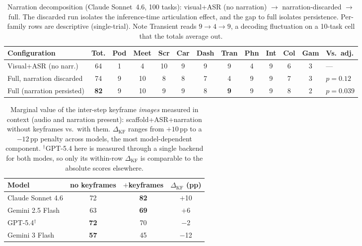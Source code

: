 \documentclass[11pt]{article}
\begin{document}
\begin{table}[!h]
\centering
\caption{Narration decomposition (Claude Sonnet~4.6, 100 tasks): visual+ASR (no
narration) $\to$ narration-discarded $\to$ full. The discarded run isolates the
inference-time articulation effect, and the gap to full isolates persistence.
Per-family rows are descriptive (single-trial). Note Transient reads $9{\to}4{\to}9$,
a decoding fluctuation on a 10-task cell that the totals average out.}
\label{tab:narration}
\small
\setlength{\tabcolsep}{3pt}
\begin{tabular}{@{}l c cccccccccc l@{}}
\toprule
\textbf{Configuration} & \textbf{Tot.} & Pod & Meet & Scr & Car & Dash & Tran & Phn & Int & Col & Gam & \textbf{Vs.\ adj.} \\
\midrule
Visual+ASR (no narr.)        & 64 & 1 & 4 & 10 & 9 & 9 & 9 & 4 & 9 & 6 & 3 & --- \\
Full, narration discarded    & 74 & 9 & 10 & 8 & 8 & 7 & 4 & 9 & 9 & 7 & 3 & $p=0.12$ \\
\rowcolor{bestcolor}
Full (narration persisted)   & \textbf{82} & 9 & 10 & 9 & 9 & 8 & \textbf{9} & 9 & 9 & 8 & 2 & $p=0.039$ \\
\bottomrule
\end{tabular}
\end{table}

\begin{table}[!h]
\centering
\caption{Marginal value of the inter-step keyframe \emph{images} measured in
context (audio and narration present): scaffold+ASR+narration without keyframes
vs.\ with them. $\Delta_\text{KF}$ ranges from $+10$\,pp to a $-12$\,pp penalty
across models, the most model-dependent component.
$^\dagger$GPT-5.4 here is measured through a single backend for both modes, so
only its within-row $\Delta_\text{KF}$ is comparable to the absolute scores
elsewhere.}
\label{tab:keyframe_context}
\small
\setlength{\tabcolsep}{6pt}
\begin{tabular}{@{}l ccc@{}}
\toprule
\textbf{Model} & \textbf{no keyframes} & \textbf{$+$keyframes} & \textbf{$\Delta_\text{KF}$ (pp)} \\
\midrule
Claude Sonnet 4.6 & 72 & \textbf{82} & $+$10 \\
Gemini 2.5 Flash  & 63 & \textbf{69} & $+$6 \\
GPT-5.4$^\dagger$ & \textbf{72} & 70 & $-$2 \\
Gemini 3 Flash    & \textbf{57} & 45 & $-$12 \\
\bottomrule
\end{tabular}
\end{table}
\end{document}
